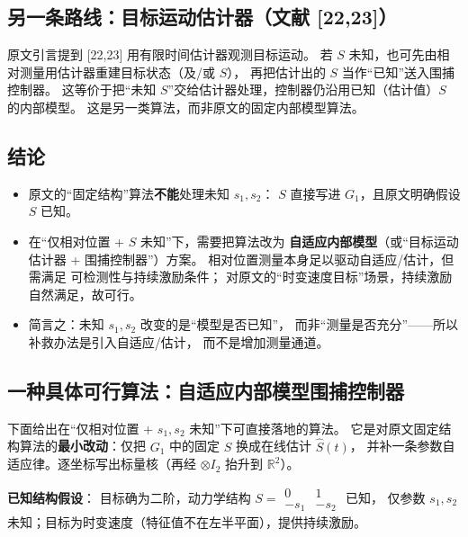 \subsection{另一条路线：目标运动估计器（文献 [22,23]）}

原文引言提到 [22,23] 用有限时间估计器观测目标运动。
若 $S$ 未知，也可先由相对测量用估计器重建目标状态（及/或 $S$），
再把估计出的 $S$ 当作“已知”送入围捕控制器。
这等价于把“未知 $S$”交给估计器处理，控制器仍沿用已知（估计值）$S$ 的内部模型。
这是另一类算法，而非原文的固定内部模型算法。

\subsection{结论}

\begin{itemize}
  \item 原文的“固定结构”算法\textbf{不能}处理未知 $s_1,s_2$：
    $S$ 直接写进 $G_1$，且原文明确假设 $S$ 已知。
  \item 在“仅相对位置 + $S$ 未知”下，需要把算法改为
    \textbf{自适应内部模型}（或“目标运动估计器 + 围捕控制器”）方案。
    相对位置测量本身足以驱动自适应/估计，但需满足
    可检测性与持续激励条件；
    对原文的“时变速度目标”场景，持续激励自然满足，故可行。
  \item 简言之：未知 $s_1,s_2$ 改变的是“模型是否已知”，
    而非“测量是否充分”——所以补救办法是引入自适应/估计，
    而不是增加测量通道。
\end{itemize}

\subsection{一种具体可行算法：自适应内部模型围捕控制器}

下面给出在“仅相对位置 + $s_1,s_2$ 未知”下可直接落地的算法。
它是对原文固定结构算法的\textbf{最小改动}：仅把 $G_1$ 中的固定 $S$ 换成在线估计 $\hat S(t)$，
并补一条参数自适应律。逐坐标写出标量核（再经 $\otimes I_2$ 抬升到 $\mathbb R^2$）。

\textbf{已知结构假设}：
目标确为二阶，动力学结构 $S=\begin{smallmatrix}0&1\\-s_1&-s_2\end{smallmatrix}$ 已知，
仅参数 $s_1,s_2$ 未知；目标为时变速度（特征值不在左半平面），提供持续激励。

